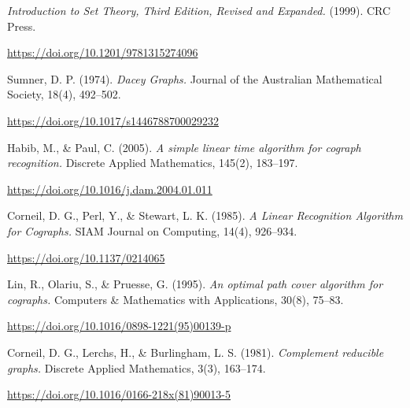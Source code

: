 
\begin{thebibliography}{99}

    \textit{Introduction to Set Theory, Third Edition, Revised and Expanded.} (1999). CRC Press.

    \url{https://doi.org/10.1201/9781315274096}

     Sumner, D. P. (1974).
    \textit{Dacey Graphs.}
    Journal of the Australian Mathematical Society, 18(4), 492–502.

    \url{https://doi.org/10.1017/s1446788700029232}

     Habib, M., \& Paul, C. (2005).
    \textit{A simple linear time algorithm for cograph recognition.}
    Discrete Applied Mathematics, 145(2), 183–197.

    \url{https://doi.org/10.1016/j.dam.2004.01.011}

     Corneil, D. G., Perl, Y., \& Stewart, L. K. (1985).
    \textit{A Linear Recognition Algorithm for Cographs.}
    SIAM Journal on Computing, 14(4), 926–934.

    \url{https://doi.org/10.1137/0214065}

     Lin, R., Olariu, S., \& Pruesse, G. (1995).
    \textit{An optimal path cover algorithm for cographs.}
    Computers \& Mathematics with Applications, 30(8), 75–83.

    \url{https://doi.org/10.1016/0898-1221(95)00139-p}

     Corneil, D. G., Lerchs, H., \& Burlingham, L. S. (1981).
    \textit{Complement reducible graphs.}
    Discrete Applied Mathematics, 3(3), 163–174.

    \url{https://doi.org/10.1016/0166-218x(81)90013-5}

\end{thebibliography}
